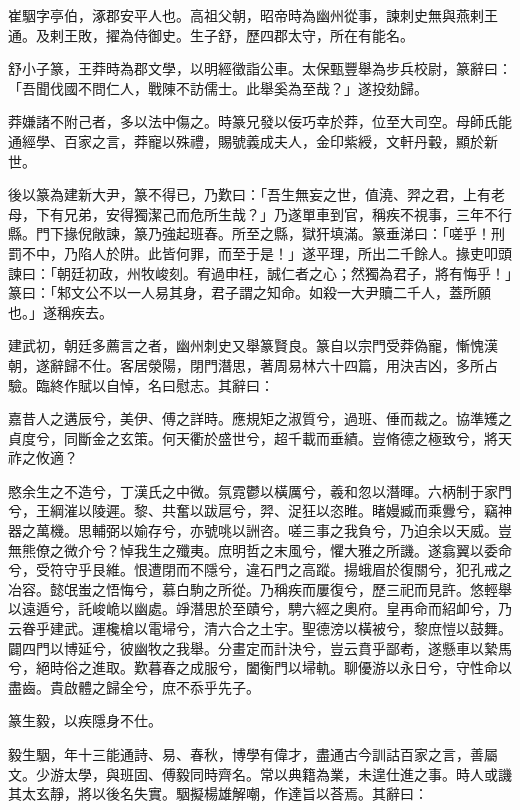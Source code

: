 
\begin{pinyinscope}
崔駰字亭伯，涿郡安平人也。高祖父朝，昭帝時為幽州從事，諫刺史無與燕剌王通。及剌王敗，擢為侍御史。生子舒，歷四郡太守，所在有能名。

舒小子篆，王莽時為郡文學，以明經徵詣公車。太保甄豐舉為步兵校尉，篆辭曰：「吾聞伐國不問仁人，戰陳不訪儒士。此舉奚為至哉？」遂投劾歸。

莽嫌諸不附己者，多以法中傷之。時篆兄發以佞巧幸於莽，位至大司空。母師氏能通經學、百家之言，莽寵以殊禮，賜號義成夫人，金印紫綬，文軒丹轂，顯於新世。

後以篆為建新大尹，篆不得已，乃歎曰：「吾生無妄之世，值澆、羿之君，上有老母，下有兄弟，安得獨潔己而危所生哉？」乃遂單車到官，稱疾不視事，三年不行縣。門下掾倪敞諫，篆乃強起班春。所至之縣，獄犴填滿。篆垂涕曰：「嗟乎！刑罰不中，乃陷人於阱。此皆何罪，而至于是！」遂平理，所出二千餘人。掾吏叩頭諫曰：「朝廷初政，州牧峻刻。宥過申枉，誠仁者之心；然獨為君子，將有悔乎！」篆曰：「邾文公不以一人易其身，君子謂之知命。如殺一大尹贖二千人，蓋所願也。」遂稱疾去。

建武初，朝廷多薦言之者，幽州刺史又舉篆賢良。篆自以宗門受莽偽寵，慚愧漢朝，遂辭歸不仕。客居滎陽，閉門潛思，著周易林六十四篇，用決吉凶，多所占驗。臨終作賦以自悼，名曰慰志。其辭曰：

嘉昔人之遘辰兮，美伊、傅之詳時。應規矩之淑質兮，過班、倕而裁之。協準矱之貞度兮，同斷金之玄策。何天衢於盛世兮，超千載而垂績。豈脩德之極致兮，將天祚之攸適？

愍余生之不造兮，丁漢氏之中微。氛霓鬱以橫厲兮，羲和忽以潛暉。六柄制于家門兮，王綱漼以陵遲。黎、共奮以跋扈兮，羿、浞狂以恣睢。睹嫚臧而乘釁兮，竊神器之萬機。思輔弼以媮存兮，亦號咷以詶咨。嗟三事之我負兮，乃迫余以天威。豈無熊僚之微介兮？悼我生之殲夷。庶明哲之末風兮，懼大雅之所譏。遂翕翼以委命兮，受符守乎艮維。恨遭閉而不隱兮，違石門之高蹤。揚蛾眉於復關兮，犯孔戒之冶容。懿氓蚩之悟悔兮，慕白駒之所從。乃稱疾而屢復兮，歷三祀而見許。悠輕舉以遠遁兮，託峻峗以幽處。竫潛思於至賾兮，騁六經之奧府。皇再命而紹卹兮，乃云眷乎建武。運欃槍以電埽兮，清六合之土宇。聖德滂以橫被兮，黎庶愷以鼓舞。闢四門以博延兮，彼幽牧之我舉。分畫定而計決兮，豈云賁乎鄙耇，遂懸車以縶馬兮，絕時俗之進取。歎暮春之成服兮，闔衡門以埽軌。聊優游以永日兮，守性命以盡齒。貴啟體之歸全兮，庶不忝乎先子。

篆生毅，以疾隱身不仕。

毅生駰，年十三能通詩、易、春秋，博學有偉才，盡通古今訓詁百家之言，善屬文。少游太學，與班固、傅毅同時齊名。常以典籍為業，未遑仕進之事。時人或譏其太玄靜，將以後名失實。駰擬楊雄解嘲，作達旨以荅焉。其辭曰：


\end{pinyinscope}
